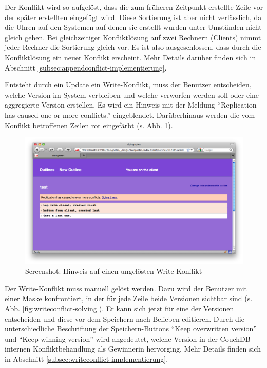 Der Konflikt wird so aufgelöst, dass die zum früheren Zeitpunkt erstellte Zeile vor der später erstellten eingefügt wird. Diese Sortierung ist aber nicht verlässlich, da die Uhren auf den Systemen auf denen sie erstellt wurden unter Umständen nicht gleich gehen. Bei gleichzeitiger Konfliktlösung auf zwei Rechnern (Clients) nimmt jeder Rechner die Sortierung gleich vor. Es ist also ausgeschlossen, dass durch die Konfliktlösung ein neuer Konflikt erscheint. Mehr Details darüber finden sich in Abschnitt \ref{subsec:appendconflict-implementierung}.






Entsteht durch ein Update ein Write-Konflikt, muss der Benutzer entscheiden, welche Version im System verbleiben und welche verworfen werden soll oder eine aggregierte Version erstellen. Es wird ein Hinweis mit der Meldung \enquote{Replication has caused one or more conflicts.} eingeblendet. Darüberhinaus werden die vom Konflikt betroffenen Zeilen rot eingefärbt (s. Abb. \ref{fig:writeconflict}). 

\medskip
\begin{figure}[ht] 
  \begin{center}
  \includegraphics[width=\textwidth]{grafik/screenshot-write-conflict} 
  \end{center}
  \caption{Screenshot: Hinweis auf einen ungelösten Write-Konflikt}
  \label{fig:writeconflict} 
\end{figure}



Der Write-Konflikt muss manuell gelöst werden. Dazu wird der Benutzer mit einer Maske konfrontiert, in der für jede Zeile beide Versionen sichtbar sind (s. Abb. \ref{fig:writeconflict-solving}). Er kann sich jetzt für eine der Versionen entscheiden und diese vor dem Speichern nach Belieben editieren. Durch die unterschiedliche Beschriftung der Speichern-Buttons \enquote{Keep overwritten version} und \enquote{Keep winning version} wird angedeutet, welche Version in der CouchDB-internen Konfliktbehandlung als Gewinnerin hervorging. Mehr Details finden sich in Abschnitt \ref{subsec:writeconflict-implementierung}.


